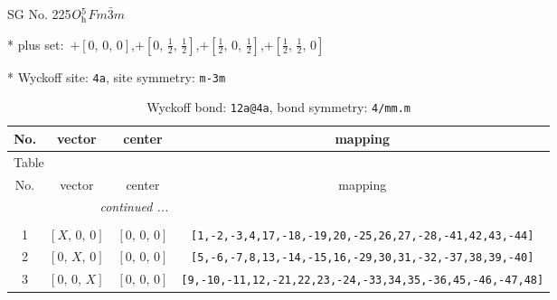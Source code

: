 \documentclass[fleqn,8pt]{jsarticle}
\begin{document}
\setcounter{MaxMatrixCols}{32}

\renewcommand{\tablename}{Table~}
\renewcommand{\figurename}{Figure~}
\begin{center}
\LARGE
SG No. 225\quad$O_{\rm h}^{5}$\quad$Fm\bar{3}m$\quad[ cubic ]
\end{center}

* plus set:\,\,\,$+\left[ 0,\, 0,\, 0 \right]$,\quad $+\left[ 0,\, \frac{1}{2},\, \frac{1}{2} \right]$,\quad $+\left[ \frac{1}{2},\, 0,\, \frac{1}{2} \right]$,\quad $+\left[ \frac{1}{2},\, \frac{1}{2},\, 0 \right]$


* Wyckoff site: {\tt 4a}, site symmetry: {\tt m-3m}
\renewcommand{\arraystretch}{1.2}
\begin{longtable}{cccc}
\caption{Wyckoff bond: {\tt 12a@4a}, bond symmetry: {\tt 4/mm.m}}
 \\
 \hline \hline
No. & vector & center & mapping \\ \hline \endfirsthead

\multicolumn{3}{l}{\tablename\ \thetable{}} \\
 \hline \hline
No. & vector & center & mapping \\ \hline \endhead

 \hline \hline
\multicolumn{3}{r}{\footnotesize\it continued ...} \\ \endfoot

 \hline \hline
\multicolumn{3}{r}{} \\ \endlastfoot

1 & $\left[ X,\, 0,\, 0 \right]$ & $\left[ 0,\, 0,\, 0 \right]$ & {\tt [1,-2,-3,4,17,-18,-19,20,-25,26,27,-28,-41,42,43,-44]} \\ \hline
2 & $\left[ 0,\, X,\, 0 \right]$ & $\left[ 0,\, 0,\, 0 \right]$ & {\tt [5,-6,-7,8,13,-14,-15,16,-29,30,31,-32,-37,38,39,-40]} \\ \hline
3 & $\left[ 0,\, 0,\, X \right]$ & $\left[ 0,\, 0,\, 0 \right]$ & {\tt [9,-10,-11,12,-21,22,23,-24,-33,34,35,-36,45,-46,-47,48]} \\
\end{longtable}
\renewcommand{\arraystretch}{1.2}
\end{document}
